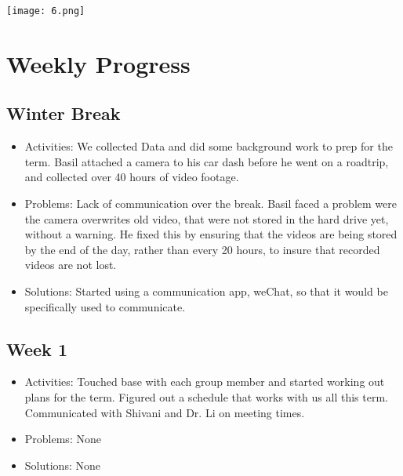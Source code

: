 \documentclass[10pt,draftclsnofoot,onecolumn,journal,compsoc]{IEEEtran}
\begin{document}
\texttt{[image: 6.png]}






\section{Weekly Progress}

\subsection{Winter Break}
\begin{itemize}
\item Activities: 
We collected Data and did some background work to prep for the term. Basil attached a camera to his car dash before he went on a roadtrip, and collected over 40 hours of video footage.
\item Problems: 
Lack of communication over the break.
Basil faced a problem were the camera overwrites old video, that were not stored in the hard drive yet, without a warning. He fixed this by ensuring that the videos are being stored by the end of the day, rather than every 20 hours, to insure that recorded videos are not lost.  

\item Solutions: 
Started using a communication app, weChat, so that it would be specifically used to communicate. 
\end{itemize}

\subsection{Week 1}
\begin{itemize}
\item Activities: 
Touched base with each group member and started working out plans for the term. Figured out a schedule that works with us all this term. Communicated with Shivani and Dr. Li on meeting times. 
\item Problems: 
None
\item Solutions: 
None
\end{itemize}
\end{document}
